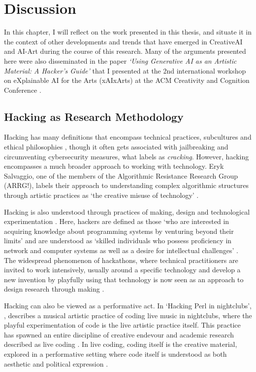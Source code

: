 \chapter{Discussion}
\label{ch:discussion}

In this chapter, I will reflect on the work presented in this thesis, and situate it in the context of other developments and trends that have emerged in CreativeAI and AI-Art during the course of this research.
Many of the arguments presented here were also disseminated in the paper \textit{`Using Generative AI as an Artistic Material: A Hacker's Guide’ } that I presented at the 2nd international workshop on eXplainable AI for the Arts (xAIxArts) at the ACM Creativity and Cognition Conference \citep{broad2024using}.


\section{Hacking as Research Methodology}

Hacking has many definitions that encompass technical practices, subcultures and ethical philosophies \citep{jordan2017genealogy}, though it often gets associated with jailbreaking and circumventing cybersecurity measures, what \cite{stallman2002hacking} labels as \textit{cracking}.
However, hacking encompasses a much broader approach to working with technology.
Eryk Salvaggio, one of the members of the Algorithmic Resistance Research Group (ARRG!), labels their approach to understanding complex algorithmic structures through artistic practices as `the creative misuse of technology' \citep{salvaggio2023cultural}.

Hacking is also understood through practices of making, design and technological experimentation \citep{hunsinger2016democratization}.
Here, hackers are defined as those `who are interested in acquiring knowledge about programming systems by venturing beyond their limits' and are understood as `skilled individuals who possess proficiency in network and computer systems as well as a desire for intellectual challenges' \citep{richterich2017introduction}.
The widespread phenomenon of hackathons, where technical practitioners are invited to work intensively, usually around a specific technology and develop a new invention by playfully using that technology is now seen as an approach to design research through making \citep{flus2021design, falk2022future, rys2023invention}.

Hacking can also be viewed as a performative act. In `Hacking Perl in nightclubs', \cite{mclean2004hacking}, describes a musical artistic practice of coding live music in nightclubs, where the playful experimentation of code is the live artistic practice itself. 
This practice has spawned an entire discipline of creative endevour and academic research described as live coding  \citep{selvaraj2021live}.
In live coding, coding itself is the creative material, explored in a performative setting where code itself is understood as both aesthetic and political expression \citep{cox2012speaking}.

